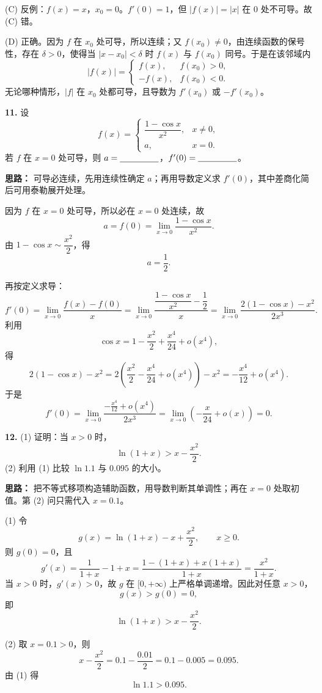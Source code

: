 (C) 反例：$f(x)=x$，$x_0=0$。$f'(0)=1$，但 $|f(x)|=|x|$ 在 $0$ 处不可导。故 (C) 错。

(D) 正确。因为 $f$ 在 $x_0$ 处可导，所以连续；又 $f(x_0)\ne0$，由连续函数的保号性，存在 $\delta>0$，使得当 $|x-x_0|<\delta$ 时 $f(x)$ 与 $f(x_0)$ 同号。于是在该邻域内
\[
|f(x)|=\begin{cases}
f(x), & f(x_0)>0,\\
-f(x), & f(x_0)<0.
\end{cases}
\]
无论哪种情形，$|f|$ 在 $x_0$ 处都可导，且导数为 $f'(x_0)$ 或 $-f'(x_0)$。

\else \answerarea[8] \fi%

\textbf{11.} 设
\[
f(x)=\begin{cases}
\dfrac{1-\cos x}{x^2}, & x\ne0,\\[8pt]
a, & x=0.
\end{cases}
\]
若 $f$ 在 $x=0$ 处可导，则 $a=\underline{\hspace{1.6cm}}$，$f'(0)=\underline{\hspace{1.6cm}}$。

\ifshowsolutions%

\textbf{思路：} 可导必连续，先用连续性确定 $a$；再用导数定义求 $f'(0)$，其中差商化简后可用泰勒展开处理。

因为 $f$ 在 $x=0$ 处可导，所以必在 $x=0$ 处连续，故
\[
a=f(0)=\lim_{x\to0}\frac{1-\cos x}{x^2}.
\]
由 $1-\cos x\sim\dfrac{x^2}{2}$，得
\[
a=\frac12.
\]

再按定义求导：
\[
f'(0)=\lim_{x\to0}\frac{f(x)-f(0)}{x}
=\lim_{x\to0}\frac{\dfrac{1-\cos x}{x^2}-\dfrac12}{x}
=\lim_{x\to0}\frac{2(1-\cos x)-x^2}{2x^3}.
\]
利用
\[
\cos x=1-\frac{x^2}{2}+\frac{x^4}{24}+o(x^4),
\]
得
\[
2(1-\cos x)-x^2=2\left(\frac{x^2}{2}-\frac{x^4}{24}+o(x^4)\right)-x^2
=-\frac{x^4}{12}+o(x^4).
\]
于是
\[
f'(0)=\lim_{x\to0}\frac{-\frac{x^4}{12}+o(x^4)}{2x^3}
=\lim_{x\to0}\left(-\frac{x}{24}+o(x)\right)=0.
\]

\else \answerarea[8] \fi%

\textbf{12.} (1) 证明：当 $x>0$ 时，
\[
\ln(1+x)>x-\frac{x^2}{2}.
\]
(2) 利用 (1) 比较 $\ln1.1$ 与 $0.095$ 的大小。

\ifshowsolutions%

\textbf{思路：} 把不等式移项构造辅助函数，用导数判断其单调性；再在 $x=0$ 处取初值。第 (2) 问只需代入 $x=0.1$。

(1) 令
\[
g(x)=\ln(1+x)-x+\frac{x^2}{2},\qquad x\ge0.
\]
则 $g(0)=0$，且
\[
g'(x)=\frac{1}{1+x}-1+x=\frac{1-(1+x)+x(1+x)}{1+x}
=\frac{x^2}{1+x}.
\]
当 $x>0$ 时，$g'(x)>0$，故 $g$ 在 $[0,+\infty)$ 上严格单调递增。因此对任意 $x>0$，
\[
g(x)>g(0)=0,
\]
即
\[
\ln(1+x)>x-\frac{x^2}{2}.
\]

(2) 取 $x=0.1>0$，则
\[
x-\frac{x^2}{2}=0.1-\frac{0.01}{2}=0.1-0.005=0.095.
\]
由 (1) 得
\[
\ln1.1>0.095.
\]

\else \answerarea[10] \fi%
